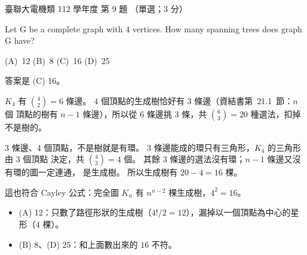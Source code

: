 \begin{pastexam}[label={px:ust-112-ee-ds-09}]{臺聯大電機類 112 學年度 第 9 題}
（單選；3 分）

Let G be a complete graph with 4 vertices. How many spanning trees does graph G have?

(A)~12 \qquad (B)~8 \qquad (C)~16 \qquad (D)~25
\end{pastexam}

\begin{pastsoln}
答案是 (C) 16。

$K_4$ 有 $\binom{4}{2} = 6$ 條邊。 $4$ 個頂點的生成樹恰好有 $3$ 條邊（資結書第~21.1~節：$n$ 個
頂點的樹有 $n - 1$ 條邊），所以從 $6$ 條邊挑 $3$ 條，共 $\binom{6}{3} = 20$ 種選法，扣掉不是樹的。

$3$ 條邊、$4$ 個頂點，不是樹就是有環。 $3$ 條邊能成的環只有三角形，$K_4$ 的三角形由 $3$ 個頂點
決定，共 $\binom{4}{3} = 4$ 個。 其餘 $3$ 條邊的選法沒有環；$n - 1$ 條邊又沒有環的圖一定連通，
是生成樹。 所以生成樹有 $20 - 4 = 16$ 棵。

這也符合 Cayley 公式：完全圖 $K_n$ 有 $n^{n-2}$ 棵生成樹，$4^{2} = 16$。

\begin{itemize}
\item (A) 12：只數了路徑形狀的生成樹（$4!/2 = 12$），漏掉以一個頂點為中心的星形（$4$ 棵）。
\item (B) 8、(D) 25：和上面數出來的 $16$ 不符。
\end{itemize}
\end{pastsoln}
